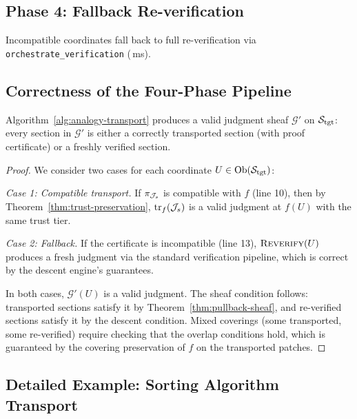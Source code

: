 \documentclass[11pt]{article}
\newcommand{\TargetSite}{\Site_{\mathrm{tgt}}}
\newcommand{\TransportMap}{\mathrm{tr}}
\newcommand{\ProofCert}{\pi}
\begin{document}
\subsection{Phase 4: Fallback Re-verification}
Incompatible coordinates fall back to full re-verification via
\texttt{orchestrate\_verification} (\compProfOrchestrateVerificationMeanMs\,ms).

\subsection{Correctness of the Four-Phase Pipeline}

\begin{theorem}\label{thm:pipeline-correct}
Algorithm~\ref{alg:analogy-transport} produces a valid judgment sheaf
$\mathcal{G}'$ on $\TargetSite$: every section in $\mathcal{G}'$ is
either a correctly transported section (with proof certificate) or a
freshly verified section.
\end{theorem}

\begin{proof}
We consider two cases for each coordinate $U \in \Ob(\TargetSite)$:

\emph{Case 1: Compatible transport.}  If $\ProofCert_{\J_s}$ is
compatible with $f$ (line 10), then by
Theorem~\ref{thm:trust-preservation}, $\TransportMap_f(\J_s)$ is a
valid judgment at $f(U)$ with the same trust tier.

\emph{Case 2: Fallback.}  If the certificate is incompatible
(line 13), $\textsc{Reverify}(U)$ produces a fresh judgment via the
standard verification pipeline, which is correct by the descent
engine's guarantees.

In both cases, $\mathcal{G}'(U)$ is a valid judgment.  The sheaf
condition follows: transported sections satisfy it by
Theorem~\ref{thm:pullback-sheaf}, and re-verified sections satisfy
it by the descent condition.  Mixed coverings (some transported, some
re-verified) require checking that the overlap conditions hold, which
is guaranteed by the covering preservation of $f$ on the transported
patches.
\end{proof}

\subsection{Detailed Example: Sorting Algorithm Transport}
\end{document}
